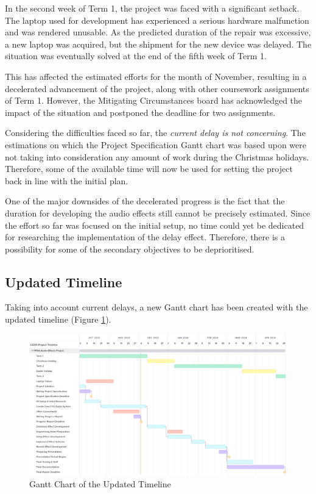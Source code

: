 In the second week of Term 1, the project was faced with a significant setback. The laptop used for development has experienced a serious hardware malfunction and was rendered unusable. As the predicted duration of the repair was excessive, a new laptop was acquired, but the shipment for the new device was delayed. The situation was eventually solved at the end of the fifth week of Term 1.

This has affected the estimated efforts for the month of November, resulting in a  decelerated advancement of the project, along with other coursework assignments of Term 1. However, the Mitigating Circumstances board has acknowledged the impact of the situation and postponed the deadline for two assignments.

Considering the difficulties faced so far, the \textit{current delay is not concerning}. The estimations on which the Project Specification Gantt chart was based upon were not taking into consideration any amount of work during the Christmas holidays. Therefore, some of the available time will now be used for setting the project back in line with the initial plan.

One of the major downsides of the decelerated progress is the fact that the duration for developing the audio effects still cannot be precisely estimated. Since the effort so far was focused on the initial setup, no time could yet be dedicated for researching the implementation of the delay effect. Therefore, there is a possibility for some of the secondary objectives to be deprioritised.

\subsection{Updated Timeline}
Taking into account current delays, a new Gantt chart has been created with the updated timeline (Figure \ref{fig:gantt}).

\begin{figure}[h]
    \centering
    \includegraphics[width=1\linewidth]{progress-report/gantt.png}
    \caption{Gantt Chart of the Updated Timeline}
    \label{fig:gantt}
\end{figure}

